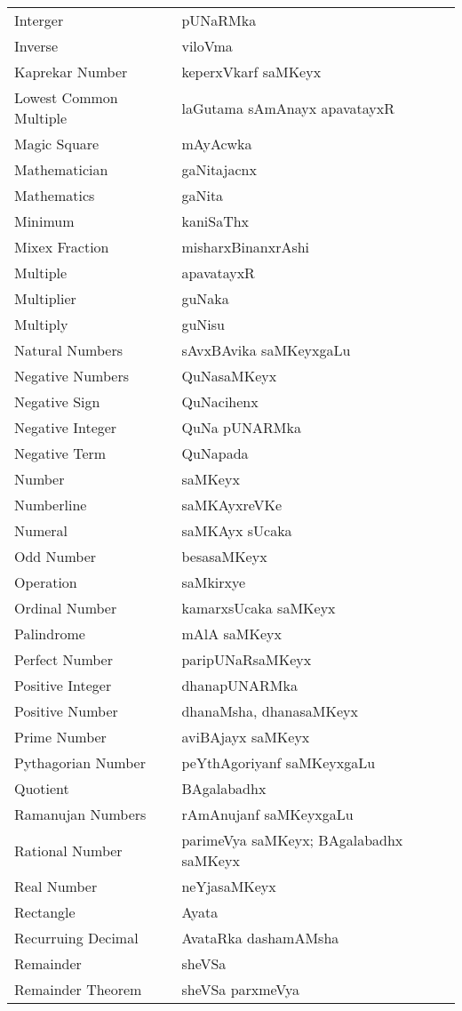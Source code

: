 \begin{longtable}{>{\rm}l@{\hspace{2cm}}l}
Interger & pUNaRMka\\
Inverse & viloVma\\
Kaprekar Number & keperxVkarf saMKeyx\\
Lowest Common Multiple & laGutama sAmAnayx apavatayxR\\
Magic Square & mAyAcwka\\
Mathematician & gaNitajacnx\\
Mathematics & gaNita\\
Minimum & kaniSaThx\\
Mixex Fraction & misharxBinanxrAshi\\
Multiple & apavatayxR\\
Multiplier & guNaka\\
Multiply & guNisu\\
Natural Numbers & sAvxBAvika saMKeyxgaLu\\
Negative Numbers & QuNasaMKeyx\\
Negative Sign & QuNacihenx\\
Negative Integer & QuNa pUNARMka\\
Negative Term & QuNapada\\
Number & saMKeyx\\
Numberline & saMKAyxreVKe\\
Numeral & saMKAyx sUcaka\\
Odd Number & besasaMKeyx\\
Operation & saMkirxye\\
Ordinal Number & kamarxsUcaka saMKeyx\\
Palindrome & mAlA saMKeyx\\
Perfect Number & paripUNaRsaMKeyx\\
Positive Integer & dhanapUNARMka\\
Positive Number & dhanaMsha, dhanasaMKeyx\\
Prime Number & aviBAjayx saMKeyx\\
Pythagorian Number  & peYthAgoriyanf saMKeyxgaLu\\
Quotient & BAgalabadhx\\
Ramanujan Numbers & rAmAnujanf saMKeyxgaLu\\
Rational Number & parimeVya saMKeyx; BAgalabadhx saMKeyx\\
Real Number & neYjasaMKeyx\\
Rectangle & Ayata\\
Recurruing Decimal & AvataRka dashamAMsha\\
Remainder & sheVSa\\
Remainder Theorem & sheVSa parxmeVya\\

\end{longtable}
